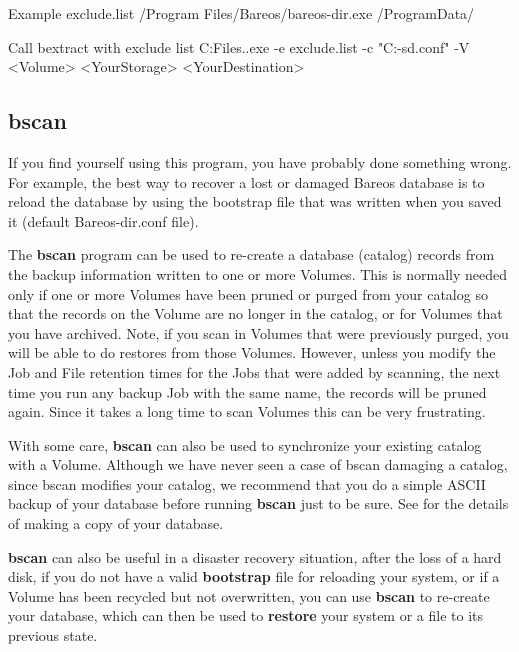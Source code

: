 \begin{config}{Example exclude.list}
/Program Files/Bareos/bareos-dir.exe
/ProgramData/
\end{config}

\begin{commands}{Call bextract with exclude list}
C:\Program Files\Bareos .\bextract.exe -e exclude.list -c "C:\ProgrammData\Bareos\bareos-sd.conf" -V <Volume> <YourStorage> <YourDestination>
\end{commands}


\subsection{bscan}
\label{bscan}

If you find yourself using this program, you have probably done something
wrong. For example, the best way to recover a lost or damaged Bareos
database is to reload the database by using the bootstrap file that
was written when you saved it (default Bareos-dir.conf file).

The {\bf bscan} program can be used to re-create a database (catalog)
records from the backup information written to one or more Volumes.  This
is normally needed only if one or more Volumes have been pruned or purged
from your catalog so that the records on the Volume are no longer in the
catalog, or for Volumes that you have archived.  Note, if you scan in
Volumes that were previously purged, you will be able to do restores from
those Volumes.  However, unless you modify the Job and File retention times
for the Jobs that were added by scanning, the next time you run any backup Job
with the same name, the records will be pruned again.  Since it takes a
long time to scan Volumes this can be very frustrating.

With some care, {\bf bscan} can also be used to synchronize your existing
catalog with a Volume.  Although we have never seen a case of bscan
damaging a catalog, since bscan modifies your catalog, we recommend that
you do a simple ASCII backup of your database before running {\bf bscan}
just to be sure.  See  for
the details of making a copy of your database.

{\bf bscan} can also be useful in a disaster recovery situation, after the
loss of a hard disk, if you do not have a valid {\bf bootstrap} file for
reloading your system, or if a Volume has been recycled but not overwritten,
you can use {\bf bscan} to re-create your database, which can then be used to
{\bf restore} your system or a file to its previous state.

